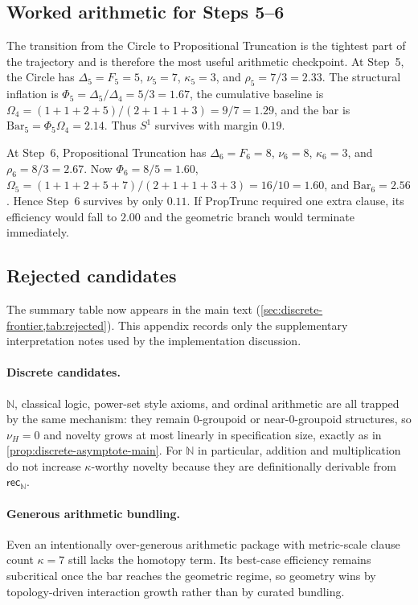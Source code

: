 \documentclass[11pt,a4paper]{article}
\theoremstyle{plain}
\theoremstyle{definition}
\theoremstyle{remark}
\newcommand{\N}{\mathbb{N}}
\begin{document}
\subsection{Worked arithmetic for Steps 5--6}
\label{app:worked-arithmetic}

The transition from the Circle to Propositional Truncation is the tightest part of the trajectory and is therefore the most useful arithmetic checkpoint.
At Step~5, the Circle has $\Delta_5=F_5=5$, $\nu_5=7$, $\kappa_5=3$, and $\rho_5=7/3=2.33$.
The structural inflation is $\Phi_5=\Delta_5/\Delta_4=5/3=1.67$, the cumulative baseline is $\Omega_4=(1+1+2+5)/(2+1+1+3)=9/7=1.29$, and the bar is $\mathrm{Bar}_5=\Phi_5\Omega_4=2.14$.
Thus $S^1$ survives with margin $0.19$.

At Step~6, Propositional Truncation has $\Delta_6=F_6=8$, $\nu_6=8$, $\kappa_6=3$, and $\rho_6=8/3=2.67$.
Now $\Phi_6=8/5=1.60$, $\Omega_5=(1+1+2+5+7)/(2+1+1+3+3)=16/10=1.60$, and $\mathrm{Bar}_6=2.56$.
Hence Step~6 survives by only $0.11$.
If PropTrunc required one extra clause, its efficiency would fall to $2.00$ and the geometric branch would terminate immediately.

\subsection{Rejected candidates}

The summary table now appears in the main text (\cref{sec:discrete-frontier,tab:rejected}).
This appendix records only the supplementary interpretation notes used by the implementation discussion.

\paragraph{Discrete candidates.}
$\N$, classical logic, power-set style axioms, and ordinal arithmetic are all trapped by the same mechanism: they remain 0-groupoid or near-0-groupoid structures, so $\nu_H=0$ and novelty grows at most linearly in specification size, exactly as in \cref{prop:discrete-asymptote-main}.
For $\N$ in particular, addition and multiplication do not increase $\kappa$-worthy novelty because they are definitionally derivable from $\mathsf{rec}_\N$.

\paragraph{Generous arithmetic bundling.}
Even an intentionally over-generous arithmetic package with metric-scale clause count $\kappa=7$ still lacks the homotopy term.
Its best-case efficiency remains subcritical once the bar reaches the geometric regime, so geometry wins by topology-driven interaction growth rather than by curated bundling.
\end{document}
